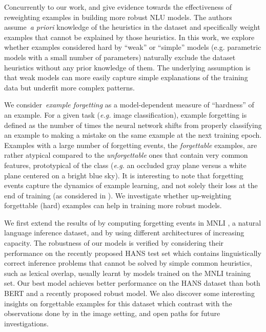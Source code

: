 Concurrently to our work,  and  give evidence towards the effectiveness of reweighting examples in building more robust NLU models. The authors assume~\emph{a priori} knowledge of the heuristics in the dataset and specifically weight examples that cannot be explained by those heuristics. In this work, we explore whether examples considered hard by ``weak'' or ``simple'' models (e.g. parametric models with a small number of parameters) naturally exclude the dataset heuristics without any prior knowledge of them. The underlying assumption is that weak models can more easily capture simple explanations of the training data but underfit more complex patterns.

We consider~\emph{example forgetting} \cite{toneva2018empirical} as a model-dependent measure of ``hardness'' of an example. For a given task (\textit{e.g.} image classification), example forgetting is defined as the number of times the neural network shifts from properly classifying an example to making a mistake on the same example at the next training epoch. Examples with a large number of forgetting events, the \emph{forgettable} examples, are rather atypical compared to the \emph{unforgettable} ones that contain very common features, prototypical of the class (\textit{e.g.} an occluded gray plane versus a white plane centered on a bright blue sky). It is interesting to note that forgetting events capture the dynamics of example learning, and not solely their loss at the end of training (as considered in ). We investigate whether up-weighting forgettable (hard) examples can help in training more robust models.  

We first extend the results of  by computing forgetting events in MNLI \cite{williams2017broad}, a natural language inference dataset, and by using different architectures of increasing capacity. The robustness of our models is verified by considering their performance on the recently proposed HANS test set \cite{linzen2019right} which contains linguistically correct inference problems that cannot be solved by simple common heuristics, such as lexical overlap, usually learnt by models trained on the MNLI training set. Our best model achieves better performance on the HANS dataset than both BERT and a recently proposed robust model. We also discover some interesting insights on forgettable examples for this dataset which contrast with the observations done by  in the image setting, and open paths for future investigations.

 


